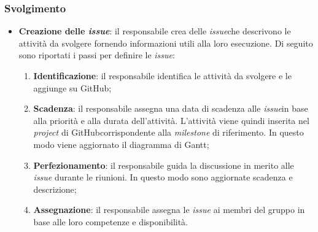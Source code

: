 \subsubsection{Svolgimento}
\begin{itemize}
	\item \textbf{Creazione delle \textit{issue\g}}: il responsabile crea
	      delle \textit{issue}\g che descrivono le attività da svolgere fornendo informazioni utili alla loro esecuzione.
	      Di seguito sono riportati i passi per definire le \textit{issue\g}:
	      \begin{enumerate}
		      \item \textbf{Identificazione}: il responsabile identifica le
		            attività da svolgere e le aggiunge su GitHub\g;

		      \item \textbf{Scadenza}: il responsabile assegna una data di
		            scadenza alle \textit{issue}\g in base alla priorità e alla durata
		            dell'attività. L'attività viene quindi inserita nel
		            \textit{project} di GitHub\g corrispondente alla
		            \textit{milestone} di riferimento. In questo modo viene
		            aggiornato il diagramma di Gantt;

		      \item \textbf{Perfezionamento}: il responsabile guida la
		            discussione in merito alle \textit{issue\g} durante le
		            riunioni. In questo modo sono aggiornate scadenza e
		            descrizione;

		      \item \textbf{Assegnazione}: il responsabile assegna le \textit{issue}\g
		            ai membri del gruppo in base alle loro competenze e
		            disponibilità.
	      \end{enumerate}
\end{itemize}
